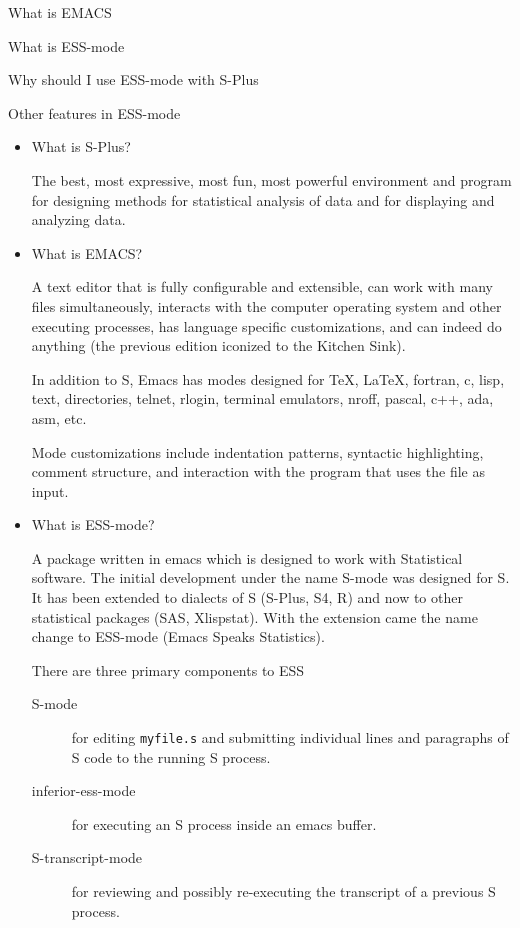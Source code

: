 \documentclass[12pt]{article}   %
\begin{document}
What is EMACS

What is ESS-mode

Why should I use ESS-mode with S-Plus

Other features in ESS-mode

\newpage
\begin{itemize}
\item
What is S-Plus?

The best, most expressive, most fun, most powerful environment and
program for designing methods for statistical analysis of data and for
displaying and analyzing data.

\newpage
\item
What is EMACS?

A text editor that is fully configurable and extensible, can work with
many files simultaneously, interacts with the computer operating
system and other executing processes, has language specific
customizations, and can indeed do anything (the previous edition
iconized to the Kitchen Sink).

In addition to S, Emacs has modes designed for \TeX, \LaTeX, fortran,
c, lisp, text, directories, telnet, rlogin, terminal emulators, nroff,
pascal, c++, ada, asm, etc.

Mode customizations include indentation patterns, syntactic
highlighting, comment structure, and interaction with the program that
uses the file as input.

\newpage
\item
What is ESS-mode?

A package written in emacs which is designed to work with Statistical
software.  The initial development under the name S-mode was designed
for S.  It has been extended to dialects of S (S-Plus, S4, R) and now
to other statistical packages (SAS, Xlispstat).  With the extension
came the name change to ESS-mode (Emacs Speaks Statistics).

There are three primary components to ESS
\begin{description}
\item [S-mode] for editing {\tt myfile.s} and submitting individual
lines and paragraphs of S code to the running S process.
\item [inferior-ess-mode]  for executing an S process inside an emacs buffer.
\item [S-transcript-mode] for reviewing and possibly re-executing the
transcript of a previous S process.
\end{description}



\end{itemize}
\end{document}
